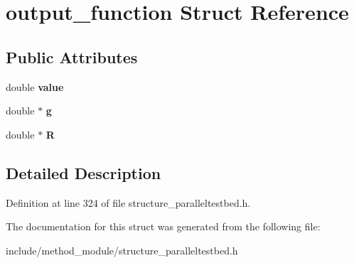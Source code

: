 \hypertarget{structoutput__function}{\section{output\-\_\-function Struct Reference}
\label{structoutput__function}
}
\subsection*{Public Attributes}
\begin{DoxyCompactItemize}
\item 
\hypertarget{structoutput__function_a723d8f723749e5bd9e5ac87b6cc59372}{double {\bfseries value}}\label{structoutput__function_a723d8f723749e5bd9e5ac87b6cc59372}

\item 
\hypertarget{structoutput__function_a3f5441928f4561ce751ec362781dbddc}{double $\ast$ {\bfseries g}}\label{structoutput__function_a3f5441928f4561ce751ec362781dbddc}

\item 
\hypertarget{structoutput__function_a3ed2f2f18011feffe67fe98a1f32c4b3}{double $\ast$ {\bfseries R}}\label{structoutput__function_a3ed2f2f18011feffe67fe98a1f32c4b3}

\end{DoxyCompactItemize}


\subsection{Detailed Description}


Definition at line 324 of file structure\-\_\-paralleltestbed.\-h.



The documentation for this struct was generated from the following file\-:\begin{DoxyCompactItemize}
\item 
include/method\-\_\-module/structure\-\_\-paralleltestbed.\-h\end{DoxyCompactItemize}
